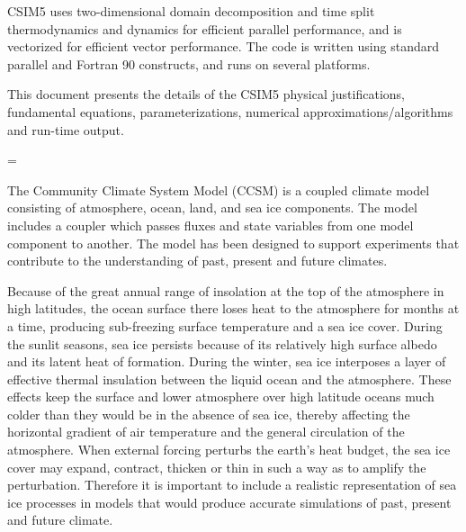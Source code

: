 CSIM5 uses two-dimensional domain decomposition and time split thermodynamics 
and dynamics for efficient parallel performance, and is vectorized for 
efficient vector performance. The code is written using standard parallel
and Fortran 90 constructs, and runs on several platforms. 

This document presents the details of the CSIM5 physical justifications, 
fundamental equations, parameterizations, numerical approximations/algorithms 
and run-time output.

\vfill\eject

\null

\nopagenumbers

\vfill\eject


\footline={\centerline{\folio}}

\vskip 10pt

     The Community Climate System Model (CCSM) is a coupled climate
model consisting of atmosphere, ocean, land, and sea ice components.
The model includes a coupler which passes fluxes and state variables
from one model component to another.  The model has been designed to 
support experiments that contribute to the understanding of past, 
present and future climates.  

     Because of the great annual range of insolation at the top of 
the atmosphere in high latitudes, the ocean surface there loses
heat to the atmosphere for months at a time, producing sub-freezing
surface temperature and a sea ice cover.  During the sunlit seasons,
sea ice persists because of its relatively high surface albedo and
its latent heat of formation.  During the winter, sea ice interposes
a layer of effective thermal insulation between the liquid ocean
and the atmosphere.  These effects keep the surface and lower atmosphere
over high latitude oceans much colder than they would be in the 
absence of sea ice, thereby affecting the horizontal gradient of 
air temperature and the general circulation of the atmosphere. 
When external forcing perturbs the earth's heat budget, the
sea ice cover may expand, contract, thicken or thin in such a 
way as to amplify the perturbation.  Therefore
it is important to include a realistic representation of sea ice
processes in models that would produce accurate simulations of 
past, present and future climate.

